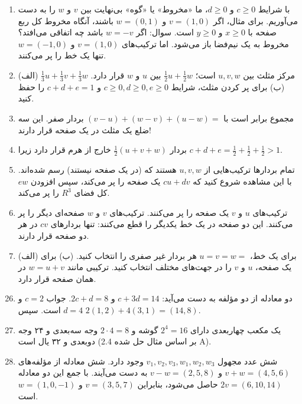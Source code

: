 \documentclass[12pt,a4paper]{article}
\begin{document}
{\begin{enumerate}
			\item با شرایط $c \ge 0$ و $d \ge 0$، ما «مخروط» یا «گوه» بی‌نهایت بین $v$ و $w$ را به دست می‌آوریم. برای مثال، اگر $v=(1,0)$ و $w=(0,1)$ باشند، آنگاه مخروط کل ربع صفحه با $x \ge 0$ و $y \ge 0$ است. سوال: اگر $w=-v$ باشد چه اتفاقی می‌افتد؟ مخروط به یک نیم‌فضا باز می‌شود. اما ترکیب‌های $v=(1,0)$ و $w=(-1,0)$ تنها یک خط را پر می‌کنند.
			
			\item (الف) $\frac{1}{3}u+\frac{1}{3}v+\frac{1}{3}w$ مرکز مثلث بین $u, v, w$ است؛ $\frac{1}{2}u+\frac{1}{2}w$ بین $u$ و $w$ قرار دارد. (ب) برای پر کردن مثلث، شرایط $c \ge 0, d \ge 0, e \ge 0$ و $c+d+e=1$ را حفظ کنید.
			
			\item مجموع برابر است با $(v-u)+(w-v)+(u-w)=$ بردار صفر. این سه ضلع یک مثلث در یک صفحه قرار دارند!
			
			\item بردار $\frac{1}{2}(u+v+w)$ خارج از هرم قرار دارد زیرا $c+d+e = \frac{1}{2}+\frac{1}{2}+\frac{1}{2} > 1$.
			
			\item تمام بردارها ترکیب‌هایی از $u, v, w$ هستند که (در یک صفحه نیستند) رسم شده‌اند. با این مشاهده شروع کنید که $cu+dv$ یک صفحه را پر می‌کند، سپس افزودن $ew$ کل فضای $R^3$ را پر می‌کند.
			
			\item ترکیب‌های $u$ و $v$ یک صفحه را پر می‌کنند. ترکیب‌های $v$ و $w$ صفحه‌ای دیگر را پر می‌کنند. این دو صفحه در یک خط یکدیگر را قطع می‌کنند: تنها بردارهای $cv$ در هر دو صفحه قرار دارند.
			
			\item (الف) برای یک خط، $u=v=w=$ هر بردار غیر صفری را انتخاب کنید. (ب) برای یک صفحه، $u$ و $v$ را در جهت‌های مختلف انتخاب کنید. ترکیبی مانند $w=u+v$ در همان صفحه قرار دارد.
		\end{enumerate}
		
		
		\begin{enumerate}
			\setcounter{enumi}{25} %
			\item دو معادله از دو مؤلفه به دست می‌آید: $c + 3d = 14$ و $2c + d = 8$. جواب $c=2$ و $d=4$ است. سپس $2(1,2)+ 4(3,1) = (14,8)$.
			
			\item یک مکعب چهاربعدی دارای $2^4 = 16$ گوشه و $2 \cdot 4 = 8$ وجه سه‌بعدی و ۲۴ وجه دوبعدی و ۳۲ یال است (بر اساس مثال حل شده 2.4 A).
			
			\item شش عدد مجهول $v_1, v_2, v_3, w_1, w_2, w_3$ وجود دارد. شش معادله از مؤلفه‌های $v + w = (4,5,6)$ و $v - w = (2,5,8)$ به دست می‌آیند. با جمع این دو معادله $2v = (6,10,14)$ حاصل می‌شود، بنابراین $v=(3,5,7)$ و $w=(1,0,-1)$ است.
			

\end{enumerate}}
\end{document}
